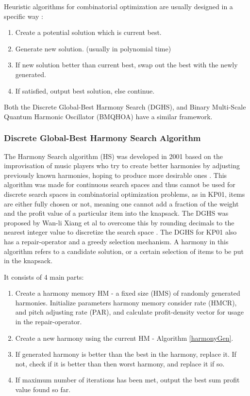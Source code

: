 \documentclass[titlepage]{article}
\begin{document}
Heuristic algorithms for combinatorial optimization are usually designed in a specific way \cite{heuristic}:
\begin{enumerate}
    \item Create a potential solution which is current best.
    \item Generate new solution. (usually in polynomial time) 
    \item If new solution better than current best, swap out the best with the newly generated. 
    \item If satisfied, output best solution, else continue.
\end{enumerate}

Both the Discrete Global-Best Harmony Search (DGHS), and Binary Multi-Scale Quantum Harmonic Oscillator (BMQHOA) have a similar framework.

\subsubsection{Discrete Global-Best Harmony Search Algorithm}
The Harmony Search algorithm (HS) was developed in 2001 based on the improvisation of music players who try to create better harmonies by adjusting previously known harmonies, hoping to produce more desirable ones \cite{geem01}. This algorithm was made for continuous search spaces and thus cannot be used for discrete search spaces in combinatorial optimization problems, as in KP01, items are either fully chosen or not, meaning one cannot add a fraction of the weight and the profit value of a particular item into the knapsack. The DGHS was proposed by Wan-li Xiang et al to overcome this by rounding decimals to the nearest integer value to discretize the search space \cite{DGHS-article}. The DGHS for KP01 also has a repair-operator and a greedy selection mechanism. A harmony in this algorithm refers to a candidate solution, or a certain selection of items to be put in the knapsack. 

It consists of 4 main parts:
\begin{enumerate}
    \item Create a harmony memory HM - a fixed size (HMS) of randomly generated harmonies. Initialize parameters harmony memory consider rate (HMCR), and pitch adjusting rate (PAR), and calculate profit-density vector for usage in the repair-operator.
    \item Create a new harmony using the current HM - Algorithm \ref{harmonyGen}.
    \item If generated harmony is better than the best in the harmony, replace it. If not, check if it is better than then worst harmony, and replace it if so. 
    \item If maximum number of iterations has been met, output the best sum profit value found so far.
\end{enumerate}
\end{document}

